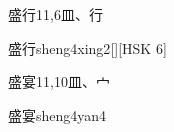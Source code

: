 \begin{Entry}{盛行}{11,6}{⽫、⾏}
  \begin{Phonetics}{盛行}{sheng4xing2}[][HSK 6]
  \end{Phonetics}
\end{Entry}

\begin{Entry}{盛宴}{11,10}{⽫、⼧}
  \begin{Phonetics}{盛宴}{sheng4yan4}
  \end{Phonetics}
\end{Entry}


